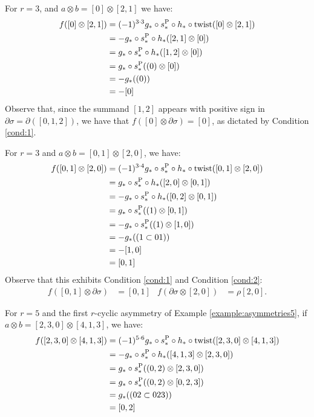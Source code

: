 \begin{example}\label{example:f3_1}
	For $r=3$, and $a\otimes b = [0]\otimes [2,1]$ we have:
	\begin{align*}
		f([0]\otimes [2,1])
		&= (-1)^{3\cdot 3}g_*\circ s_*^{\operatorname{P}}\circ h_*\circ \operatorname{twist}([0]\otimes [2,1])
		\\
		&= -g_*\circ s_*^{\operatorname{P}}\circ h_*([2,1]\otimes [0])
		\\
		&= g_*\circ s_*^{\operatorname{P}}\circ h_*([1,2]\otimes [0])
		\\
		&= g_*\circ s_*^{\operatorname{P}}((0)\otimes [0])
		\\
		&= -g_*((0))
		\\
		&= -[0]
	\end{align*}
	Observe that, since the summand $[1,2]$ appears with positive sign in $\partial \sigma = \partial([0,1,2])$, we have that $f([0]\otimes \partial\sigma) = [0]$, as dictated by Condition \eqref{cond:1}.
\end{example}

\begin{example}\label{example:f3_2}
	For $r=3$ and $a\otimes b = [0,1]\otimes [2,0]$, we have:
	\begin{align*}
		f([0,1]\otimes [2,0]) &= (-1)^{3\cdot 4}g_*\circ s_*^{\operatorname{P}}\circ h_*\circ \operatorname{twist}([0,1]\otimes [2,0])
		\\
		&= g_*\circ s_*^{\operatorname{P}}\circ h_*([2,0]\otimes [0,1])
		\\
		&= -g_*\circ s_*^{\operatorname{P}}\circ h_*([0,2]\otimes [0,1])
		\\
		&= g_*\circ s_*^{\operatorname{P}}((1)\otimes [0,1])
		\\
		&= -g_*\circ s_*^{\operatorname{P}}((1)\otimes [1,0])
		\\
		&= -g_*((1\subset 01))
		\\
		&= -[1,0]
		\\
		&= [0,1]
	\end{align*}
	Observe that this exhibits Condition \eqref{cond:1} and Condition \eqref{cond:2}:
	\begin{align*}
		f([0,1]\otimes \partial\sigma) &= [0,1]
		&
		f(\partial\sigma \otimes [2,0]) &= \rho[2,0].
	\end{align*}
\end{example}

\begin{example}\label{example:f5_1}
	For $r=5$ and the first $r$-cyclic asymmetry of Example \ref{example:asymmetries5}, if $a\otimes b = [2,3,0]\otimes [4,1,3]$, we have:
	\begin{align*}
		f([2,3,0]\otimes [4,1,3]) &= (-1)^{5\cdot 6}g_*\circ s_*^{\operatorname{P}}\circ h_*\circ \operatorname{twist}([2,3,0]\otimes [4,1,3])
		\\
		&= -g_*\circ s_*^{\operatorname{P}}\circ h_*([4,1,3]\otimes [2,3,0])
		\\
		&= g_*\circ s_*^{\operatorname{P}}((0,2)\otimes [2,3,0])
		\\
		&= g_*\circ s_*^{\operatorname{P}}((0,2)\otimes [0,2,3])
		\\
		&= g_*((02\subset 023))
		\\
		&= [0,2]
	\end{align*}
\end{example}

